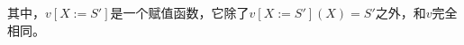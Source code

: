 \documentclass[9pt, CJK]{beamer}
\begin{document}
\begin{frame}
{\begin{definition}
				其中，$v[X:= S']$是一个赋值函数，它除了$v[X:= S'](X)=S'$之外，和$v$完全相同。
			\end{definition}
		}
	\end{frame}
\end{document}
